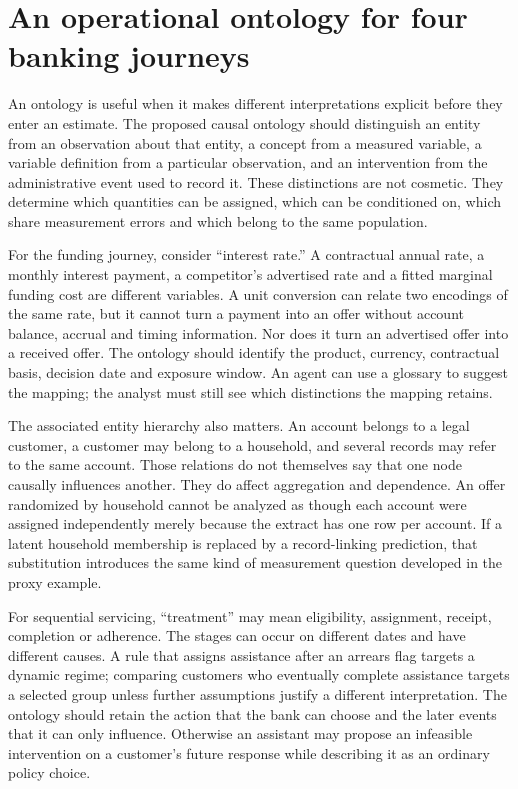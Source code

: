 \hypertarget{an-operational-ontology-for-four-banking-journeys}{%
\section{An operational ontology for four banking
journeys}\label{an-operational-ontology-for-four-banking-journeys}}

An ontology is useful when it makes different interpretations explicit
before they enter an estimate. The proposed causal ontology should
distinguish an entity from an observation about that entity, a concept
from a measured variable, a variable definition from a particular
observation, and an intervention from the administrative event used to
record it. These distinctions are not cosmetic. They determine which
quantities can be assigned, which can be conditioned on, which share
measurement errors and which belong to the same population.

For the funding journey, consider ``interest rate.'' A contractual
annual rate, a monthly interest payment, a competitor's advertised rate
and a fitted marginal funding cost are different variables. A unit
conversion can relate two encodings of the same rate, but it cannot turn
a payment into an offer without account balance, accrual and timing
information. Nor does it turn an advertised offer into a received offer.
The ontology should identify the product, currency, contractual basis,
decision date and exposure window. An agent can use a glossary to
suggest the mapping; the analyst must still see which distinctions the
mapping retains.

The associated entity hierarchy also matters. An account belongs to a
legal customer, a customer may belong to a household, and several
records may refer to the same account. Those relations do not themselves
say that one node causally influences another. They do affect
aggregation and dependence. An offer randomized by household cannot be
analyzed as though each account were assigned independently merely
because the extract has one row per account. If a latent household
membership is replaced by a record-linking prediction, that substitution
introduces the same kind of measurement question developed in the proxy
example.

For sequential servicing, ``treatment'' may mean eligibility,
assignment, receipt, completion or adherence. The stages can occur on
different dates and have different causes. A rule that assigns
assistance after an arrears flag targets a dynamic regime; comparing
customers who eventually complete assistance targets a selected group
unless further assumptions justify a different interpretation. The
ontology should retain the action that the bank can choose and the later
events that it can only influence. Otherwise an assistant may propose an
infeasible intervention on a customer's future response while describing
it as an ordinary policy choice.

